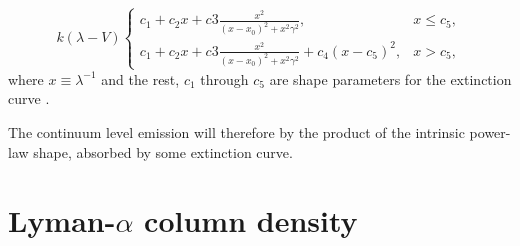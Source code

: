 \documentclass[a4paper,fleqn,usenatbib]{mnras}
\begin{document}
\begin{equation} 
k(\lambda - V)
\begin{cases}
c_1 + c_2 x + c3 \frac{x^2}{(x - x_0)^2 + x^2 \gamma^2},&  x\leq c_5,\\
c_1 + c_2 x + c3 \frac{x^2}{(x - x_0)^2 + x^2 \gamma^2} + c_4(x - c_5)^2, &  x > c_5,
\end{cases}
\end{equation}
where $x \equiv \lambda^{-1}$ and the rest, $c_1$ through $c_5$ are shape parameters for the extinction curve \citep{Fitzpatrick2007}. 

The continuum level emission will therefore by the product of the intrinsic power-law shape, absorbed by some extinction curve. 



\section{Lyman-$\alpha$ column density} \label{app_absorp}
\end{document}
